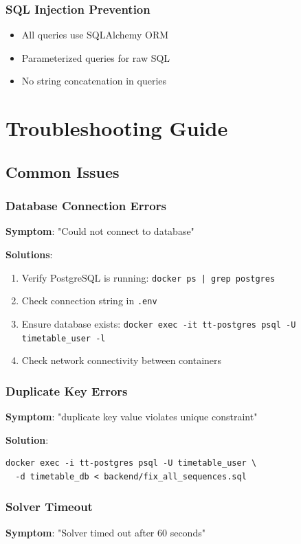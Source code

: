 \documentclass[12pt,a4paper]{article}
\begin{document}
\subsubsection{SQL Injection Prevention}
\begin{itemize}
    \item All queries use SQLAlchemy ORM
    \item Parameterized queries for raw SQL
    \item No string concatenation in queries
\end{itemize}


\section{Troubleshooting Guide}

\subsection{Common Issues}

\subsubsection{Database Connection Errors}
\textbf{Symptom}: "Could not connect to database"

\textbf{Solutions}:
\begin{enumerate}
    \item Verify PostgreSQL is running: \texttt{docker ps | grep postgres}
    \item Check connection string in \texttt{.env}
    \item Ensure database exists: \texttt{docker exec -it tt-postgres psql -U timetable\_user -l}
    \item Check network connectivity between containers
\end{enumerate}

\subsubsection{Duplicate Key Errors}
\textbf{Symptom}: "duplicate key value violates unique constraint"

\textbf{Solution}:
\begin{verbatim}
docker exec -i tt-postgres psql -U timetable_user \
  -d timetable_db < backend/fix_all_sequences.sql
\end{verbatim}

\subsubsection{Solver Timeout}
\textbf{Symptom}: "Solver timed out after 60 seconds"
\end{document}
